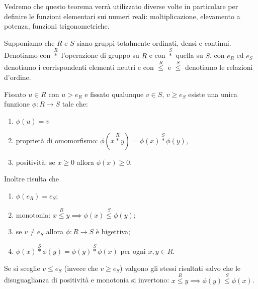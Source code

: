 Vedremo che questo teorema verrà utilizzato diverse volte 
in particolare per definire le funzioni elementari 
sui numeri reali: moltiplicazione, elevamento a potenza, 
funzioni trigonometriche.

\begin{theorem}%
  \label{th:isomorfismo}%
  Supponiamo che $R$ e $S$ siano gruppi totalmente ordinati, densi e continui.
  Denotiamo con $\stackrel R*$ l'operazione di gruppo su $R$ 
  e con $\stackrel S*$ quella su $S$, con $e_R$ ed $e_S$ denotiamo i corrispondenti 
  elementi neutri e con $\stackrel R\le$ e $\stackrel S\le$ 
  denotiamo le relazioni d'ordine.

  Fissato $u\in R$ con $u > e_R$ e fissato qualunque $v \in S$,
  $v \ge e_S$ esiste una unica funzione $\phi\colon R\to S$
  tale che:
  \begin{enumerate}
    \item $\phi(u)=v$
    \item proprietà di omomorfismo: 
    $\phi(x \stackrel R* y) = \phi(x) \stackrel S* \phi(y)$,
    \item positività:
    se $x\ge 0$ allora $\phi(x) \ge 0$. 
  \end{enumerate}
  Inoltre risulta che 
  \begin{enumerate}
    \item $\phi(e_R)=e_S$;
    \item monotonia: 
    $x\stackrel R\le y \implies \phi(x) \stackrel S\le \phi(y)$;
    \item se $v\neq e_S$ allora $\phi\colon R\to S$ è bigettiva;
    \item $\phi(x) \stackrel S* \phi(y) = \phi(y)\stackrel S*\phi(x)$ 
    per ogni $x,y\in R$.
  \end{enumerate}

  Se si sceglie $v\le e_S$ (invece che $v\ge e_S$) 
  valgono gli stessi risultati salvo 
  che le disuguaglianza di positività e monotonia si invertono:
  $x\stackrel R\le y \implies \phi(y) \stackrel S\le \phi(x)$.
\end{theorem}
    
